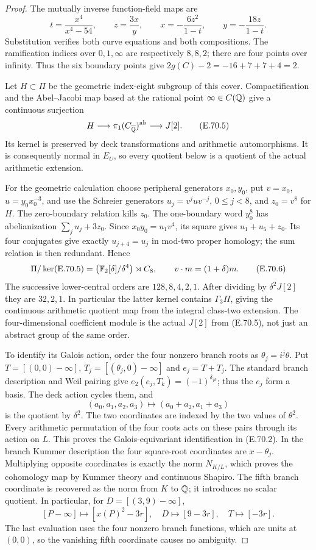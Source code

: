 \begin{proof}
The mutually inverse function-field maps are
\[
 t=\frac{x^4}{x^4-54},\qquad z=\frac{3x}{y},\qquad
 x=-\frac{6z^2}{1-t},\qquad y=-\frac{18z}{1-t}.
 \tag{E.70.4}
\]
Substitution verifies both curve equations and both compositions.
The ramification indices over $0,1,\infty$ are respectively
$8,8,2$; there are four points over infinity. Thus the six boundary
points give $2g(C)-2=-16+7+7+4=2$.

Let $H\subset\Pi$ be the geometric index-eight subgroup of this
cover. Compactification and the Abel--Jacobi map based at the rational
point $\infty\in C(\mathbb Q)$ give a continuous surjection
\[
 H\longrightarrow\pi_1(C_{\overline{\mathbb Q}})^{\rm ab}
                    \longrightarrow J[2].
 \tag{E.70.5}
\]
Its kernel is preserved by deck transformations and arithmetic
automorphisms. It is consequently normal in $E_U$, so every quotient
below is a quotient of the actual arithmetic extension.

For the geometric calculation choose peripheral generators $x_0,y_0$,
put $v=x_0$, $u=y_0x_0^{-3}$, and use the Schreier generators
$u_j=v^juv^{-j}$, $0\le j<8$, and $z_0=v^8$ for $H$.
The zero-boundary relation kills $z_0$. The one-boundary word
$y_0^8$ has abelianization $\sum_j u_j+3z_0$.
Since $x_0y_0=u_1v^4$, its square gives $u_1+u_5+z_0$.
Its four conjugates give exactly $u_{j+4}=u_j$ in mod-two
proper homology; the sum relation is then redundant. Hence
\[
 \Pi/\ker(\text{E.70.5})
   =\bigl(\mathbb F_2[\delta]/\delta^4\bigr)\rtimes C_8,
 \qquad v\cdot m=(1+\delta)m.
 \tag{E.70.6}
\]
The successive lower-central orders are $128,8,4,2,1$.
After dividing by $\delta^2J[2]$ they are $32,2,1$.
In particular the latter kernel contains $\Gamma_3\Pi$, giving
the continuous arithmetic quotient map from the integral class-two
extension. The four-dimensional coefficient module is the actual
$J[2]$ from (E.70.5), not just an abstract group of the same order.

To identify its Galois action, order the four nonzero branch roots
as $\theta_j=i^j\theta$. Put
$T=[(0,0)-\infty]$, $T_j=[(\theta_j,0)-\infty]$ and
$e_j=T+T_j$. The standard branch description and Weil pairing
\cite[\S4, pp.~5--6]{RootGrossHanoi} give
$e_2(e_j,T_k)=(-1)^{\delta_{jk}}$; thus the $e_j$ form a basis.
The deck action cycles them, and
\[
 (a_0,a_1,a_2,a_3)\longmapsto(a_0+a_2,a_1+a_3)
 \tag{E.70.7}
\]
is the quotient by $\delta^2$. The two coordinates are indexed by
the two values of $\theta^2$. Every arithmetic permutation of the
four roots acts on these pairs through its action on $L$.
This proves the Galois-equivariant identification in (E.70.2).
In the branch Kummer description the four square-root coordinates
are $x-\theta_j$. Multiplying opposite coordinates is exactly
the norm $N_{K/L}$, which proves the cohomology map by Kummer
theory and continuous Shapiro. The fifth branch coordinate is
recovered as the norm from $K$ to $\mathbb Q$; it introduces no scalar
quotient. In particular, for $D=[(3,9)-\infty]$,
\[
 [P-\infty]\longmapsto[x(P)^2-3r],\quad
 D\longmapsto[9-3r],\quad T\longmapsto[-3r].
 \tag{E.70.8}
\]
The last evaluation uses the four nonzero branch functions, which
are units at $(0,0)$, so the vanishing fifth coordinate causes no
ambiguity.


\end{proof}

